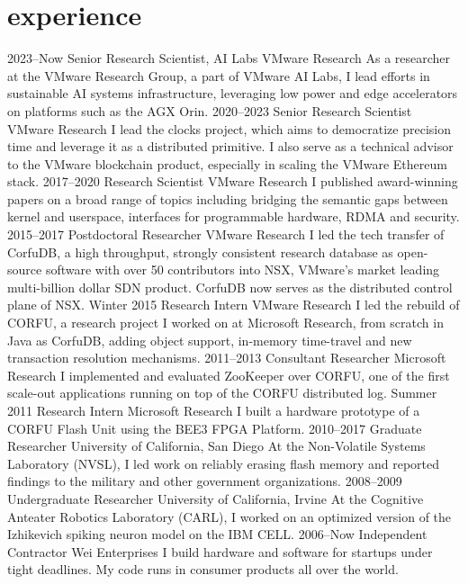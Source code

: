 \section{experience}

\begin{entrylist}
\entry
{2023--Now}
{Senior Research Scientist, AI Labs}
{VMware Research}
{\small As a researcher at the VMware Research Group, a part of VMware AI Labs, I lead efforts in sustainable AI systems infrastructure, leveraging low power and edge accelerators on platforms such as the AGX Orin.}
\entry
{2020--2023}
{Senior Research Scientist}
{VMware Research}
{\small I lead the clocks project, which aims to democratize precision time and leverage it as a distributed primitive.
I also serve as a technical advisor to the VMware blockchain product, especially in scaling the VMware Ethereum stack.}
\entry
{2017--2020}
{Research Scientist}
{VMware Research}
{\small I published award-winning papers on a broad range of topics including
 bridging the semantic gaps between kernel and userspace, interfaces for programmable hardware, 
 RDMA and security. }
\entry
{2015--2017}
{Postdoctoral Researcher}
{VMware Research}
{\small I led the tech transfer of CorfuDB, a high throughput, strongly consistent research database 
as open-source software with over 50 contributors into NSX, VMware's market leading multi-billion dollar 
SDN product. CorfuDB now serves as the distributed control plane of NSX.}
\entry
{Winter 2015}
{Research Intern}
{VMware Research}
{\small I led the rebuild of CORFU, a research project I worked on at Microsoft Research, from scratch in Java as CorfuDB, adding object support, in-memory time-travel and new transaction resolution mechanisms.}
\entry
{2011--2013}
{Consultant Researcher}
{Microsoft Research}
{\small I implemented and evaluated ZooKeeper over CORFU, one of the first scale-out applications running on top of the CORFU distributed log.}
\entry
{Summer 2011}
{Research Intern}
{Microsoft Research}
{\small I built a hardware prototype of a CORFU Flash Unit using the BEE3 FPGA Platform.}
\entry
{2010--2017}
{Graduate Researcher}
{University of California, San Diego}
{\small At the Non-Volatile Systems Laboratory (NVSL), I led work on reliably erasing flash memory and reported findings to the military and other government organizations.}
\entry
{2008--2009}
{Undergraduate Researcher}
{University of California, Irvine}
{\small At the Cognitive Anteater Robotics Laboratory (CARL), I worked on an optimized version of the Izhikevich spiking neuron model on the IBM CELL.}
\entry
{2006--Now}
{Independent Contractor}
{Wei Enterprises}
{\small I build hardware and software for startups under tight deadlines. My code runs in consumer products all over the world.}
\end{entrylist}